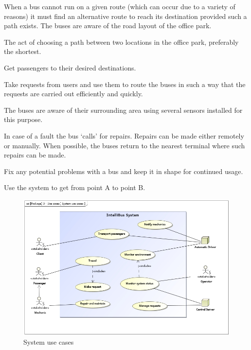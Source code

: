 \documentclass[a4paper]{article}
\begin{document}
\begin{description}[style=nextline]
	\item[Find alternative \gls{route}]
		When a bus cannot run on a given \gls{route} (which can occur
		due to a variety of reasons) it must find an alternative
		\gls{route} to reach its destination provided such a path
		exists. The buses are aware of the road layout of the office
		park.

	\item[Select \gls{route}]
		The act of choosing a path between two locations in the office
		park, preferably the shortest.

	\item[Transport passengers]
		Get passengers to their desired destinations.

	\item[Manage \gls{request}s]
		Take \gls{request}s from users and use them to \gls{route} the
		buses in such a way that the \gls{request}s are carried out
		efficiently and quickly.

	\item[Monitor environment]
		The buses are aware of their surrounding area using several
		\gls{sensor}s installed for this purpose.

	\item[Notify mechanics]
		In case of a fault the bus ‘calls’ for repairs. Repairs can be
		made either remotely or manually. When possible, the buses
		return to the nearest \gls{terminal} where such repairs can be
		made.

	\item[Repair and maintain]
		Fix any potential problems with a bus and keep it in shape for
		continued usage.

	\item[Travel]
		Use the system to get from point A to point B.
\end{description}

\begin{figure}
	\centering
	\includegraphics[width=\textwidth]{uc-system}
	\caption{System use cases}
\end{figure}
\end{document}
